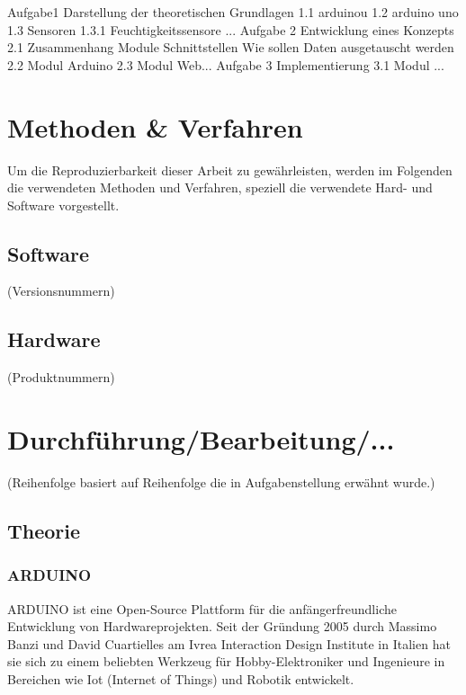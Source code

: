 \documentclass[
    load-dhbw-templates,
    load-preamble = true,
    auto-intro-pages = all,
    add-tocs-to-toc,
    debug = true,
    language = english,
    mainlanguage = ngerman,
    add-bibliography,
    bib-file = dhbw-source.bib,
    biblatex/style = alphabetic, 
]{iodhbwm}
\begin{document}
    Aufgabe1 
    Darstellung der theoretischen Grundlagen
    1.1 arduinou
    1.2 arduino uno
    1.3 Sensoren
    1.3.1 Feuchtigkeitssensore
    ...
    Aufgabe 2
    Entwicklung eines Konzepts
    2.1 Zusammenhang Module
    Schnittstellen
    Wie sollen Daten ausgetauscht werden
    2.2 Modul Arduino
    2.3 Modul Web...
    Aufgabe 3
    Implementierung
    3.1 Modul ... 
    





\chapter{Methoden \& Verfahren}
    Um die Reproduzierbarkeit dieser Arbeit zu gewährleisten, werden im Folgenden die verwendeten Methoden und Verfahren, speziell die verwendete Hard- und Software vorgestellt.
    
    \section{Software}
        (Versionsnummern)
    \section{Hardware}
        (Produktnummern)
    


\chapter{Durchführung/Bearbeitung/...}

(Reihenfolge basiert auf Reihenfolge die in Aufgabenstellung erwähnt wurde.)

    \section{Theorie}
        \subsection{ARDUINO}%

        ARDUINO ist eine Open-Source Plattform für die anfängerfreundliche Entwicklung von Hardwareprojekten.
        Seit der Gründung 2005 durch Massimo Banzi und David Cuartielles am Ivrea Interaction Design Institute in Italien hat sie sich zu einem beliebten Werkzeug für Hobby-Elektroniker und Ingenieure in Bereichen wie Iot (Internet of Things) und Robotik entwickelt.  
       
\end{document}
